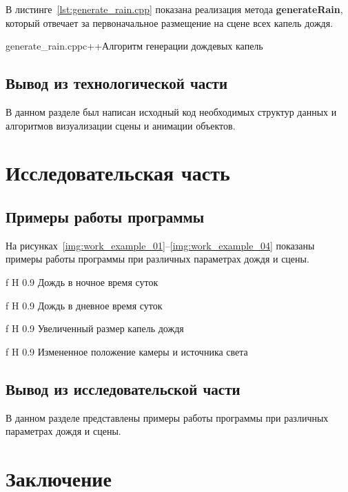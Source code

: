 В листинге~\ref{lst:generate_rain.cpp} показана реализация метода \textbf{generateRain}, который отвечает за первоначальное размещение на сцене всех капель дождя.

{generate_rain.cpp}{c++}{Алгоритм генерации дождевых капель}

\section*{Вывод из технологической части}

В данном разделе был написан исходный код необходимых структур данных и алгоритмов визуализации сцены и анимации объектов. 

\chapter{Исследовательская часть}

\section{Примеры работы программы}

На рисунках~\ref{img:work_example_01}--\ref{img:work_example_04} показаны примеры работы программы при различных параметрах дождя и сцены.

    {f}
    {H}
    {0.9\textwidth}
    {Дождь в ночное время суток}
    
    {f}
    {H}
    {0.9\textwidth}
    {Дождь в дневное время суток}
    
    {f}
    {H}
    {0.9\textwidth}
    {Увеличенный размер капель дождя}
    
    {f}
    {H}
    {0.9\textwidth}
    {Измененное положение камеры и источника света}

\section*{Вывод из исследовательской части}

В данном разделе представлены примеры работы программы при различных параметрах дождя и сцены. 

{\center\chapter*{Заключение}}

